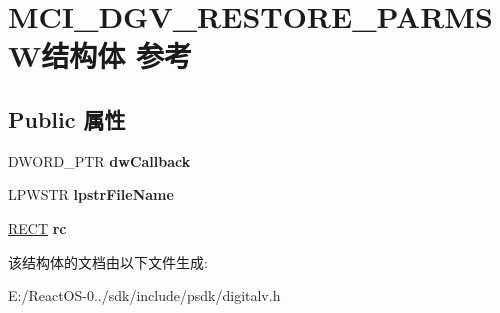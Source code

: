 \hypertarget{struct_m_c_i___d_g_v___r_e_s_t_o_r_e___p_a_r_m_s_w}{}\section{M\+C\+I\+\_\+\+D\+G\+V\+\_\+\+R\+E\+S\+T\+O\+R\+E\+\_\+\+P\+A\+R\+M\+S\+W结构体 参考}
\label{struct_m_c_i___d_g_v___r_e_s_t_o_r_e___p_a_r_m_s_w}
\subsection*{Public 属性}
\begin{DoxyCompactItemize}
\item 
\mbox{\label{struct_m_c_i___d_g_v___r_e_s_t_o_r_e___p_a_r_m_s_w_aeec2f5f2cfd7685d68d90b97a0bd0fc3}} 
D\+W\+O\+R\+D\+\_\+\+P\+TR {\bfseries dw\+Callback}
\item 
\mbox{\label{struct_m_c_i___d_g_v___r_e_s_t_o_r_e___p_a_r_m_s_w_a7679c85fa3d44be6a2979fcf04297f9e}} 
L\+P\+W\+S\+TR {\bfseries lpstr\+File\+Name}
\item 
\mbox{\label{struct_m_c_i___d_g_v___r_e_s_t_o_r_e___p_a_r_m_s_w_addf82cc974c03b47b171c2c34c748bc5}} 
\hyperlink{structtag_r_e_c_t}{R\+E\+CT} {\bfseries rc}
\end{DoxyCompactItemize}


该结构体的文档由以下文件生成\+:\begin{DoxyCompactItemize}
\item 
E\+:/\+React\+O\+S-\/0../sdk/include/psdk/digitalv.\+h\end{DoxyCompactItemize}
